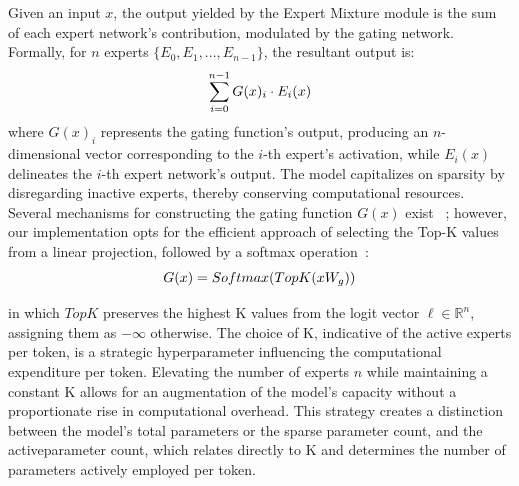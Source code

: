 \documentclass{article}
\begin{document}
Given an input $x$, the output yielded by the Expert Mixture module is the sum of each expert network's contribution, modulated by the gating network.
Formally, for $ n $ experts $\{E_0, E_1, ..., E_{n-1}\}$, the resultant output is:
\vspace{-5pt}
\begin{equation}
\centering
\sum_{i=0}^{n-1} G(x)_i \cdot E_i(x)
\end{equation}
where $ G(x)_i $ represents the gating function's output, producing an $ n $-dimensional vector corresponding to the $ i $-th expert's activation, while $ E_i(x) $ delineates the $ i $-th expert network's output.
The model capitalizes on sparsity by disregarding inactive experts, thereby conserving computational resources.
Several mechanisms for constructing the gating function $ G(x) $ exist ~\citep{clark2022unified,hazimeh2021dselect,zhou2022mixture};
however, our implementation opts for the efficient approach of selecting the Top-K values from a linear projection, followed by a softmax operation~\citep{shazeer2017outrageously}:
\vspace{-5pt}
\begin{equation}
\centering
G(x) = Softmax(TopK(xW_g)) 
\end{equation}

in which $ TopK $ preserves the highest K values from the logit vector $ \ell \in \mathbb{R}^n $, assigning them as $-\infty$ otherwise. 
The choice of K, indicative of the active experts per token, is a strategic hyperparameter influencing the computational expenditure per token.
Elevating the number of experts $ n $ while maintaining a constant K allows for an augmentation of the model's capacity without a proportionate rise in computational overhead.
This strategy creates a distinction between the model's total parameters or the sparse parameter count, and the activeparameter count, which relates directly to K and determines the number of parameters actively employed per token.
\end{document}
